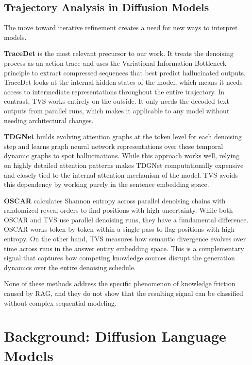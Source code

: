 \documentclass[11pt]{article}
\begin{document}
\subsection{Trajectory Analysis in Diffusion Models}
The move toward iterative refinement creates a need for new ways to interpret models.

\textbf{TraceDet} \citep{tracedet2025} is the most relevant precursor to our work. It treats the denoising process as an action trace and uses the Variational Information Bottleneck principle to extract compressed sequences that best predict hallucinated outputs. TraceDet looks at the internal hidden states of the model, which means it needs access to intermediate representations throughout the entire trajectory. In contrast, TVS works entirely on the outside. It only needs the decoded text outputs from parallel runs, which makes it applicable to any model without needing architectural changes.

\textbf{TDGNet} \citep{tdgnet2026} builds evolving attention graphs at the token level for each denoising step and learns graph neural network representations over these temporal dynamic graphs to spot hallucinations. While this approach works well, relying on highly detailed attention patterns makes TDGNet computationally expensive and closely tied to the internal attention mechanism of the model. TVS avoids this dependency by working purely in the sentence embedding space.

\textbf{OSCAR} \citep{oscar2026} calculates Shannon entropy across parallel denoising chains with randomized reveal orders to find positions with high uncertainty. While both OSCAR and TVS use parallel denoising runs, they have a fundamental difference. OSCAR works token by token within a single pass to flag positions with high entropy. On the other hand, TVS measures how semantic divergence evolves over time across runs in the answer entity embedding space. This is a complementary signal that captures how competing knowledge sources disrupt the generation dynamics over the entire denoising schedule.

None of these methods address the specific phenomenon of knowledge friction caused by RAG, and they do not show that the resulting signal can be classified without complex sequential modeling.

\section{Background: Diffusion Language Models}
\end{document}
